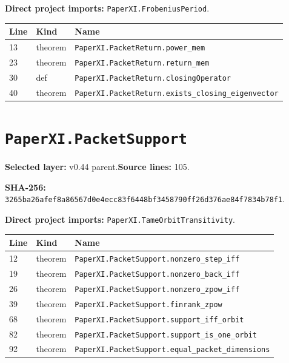 \documentclass[10pt,oneside]{book}
\begin{document}
\textbf{Direct project imports:} \nolinkurl{PaperXI.FrobeniusPeriod}.

\begin{longtable}{@{}p{}p{}p{}@{}}\toprule Line&Kind&Name\\\midrule\endhead

13&theorem&\nolinkurl{PaperXI.PacketReturn.power_mem}\\

23&theorem&\nolinkurl{PaperXI.PacketReturn.return_mem}\\

30&def&\nolinkurl{PaperXI.PacketReturn.closingOperator}\\

40&theorem&\nolinkurl{PaperXI.PacketReturn.exists_closing_eigenvector}\\

\bottomrule\end{longtable}

\section{\texorpdfstring{\nolinkurl{PaperXI.PacketSupport}}{PaperXI.PacketSupport}}\label{module:PaperXI.PacketSupport}

\textbf{Selected layer:} v0.44 parent.\quad\textbf{Source lines:} 105.\par\textbf{SHA-256:} {\scriptsize\nolinkurl{3265ba26afef8a86567d0e4ecc83f6448bf3458790ff26d376ae84f7834b78f1}}.


\textbf{Direct project imports:} \nolinkurl{PaperXI.TameOrbitTransitivity}.

\begin{longtable}{@{}p{}p{}p{}@{}}\toprule Line&Kind&Name\\\midrule\endhead

12&theorem&\nolinkurl{PaperXI.PacketSupport.nonzero_step_iff}\\

19&theorem&\nolinkurl{PaperXI.PacketSupport.nonzero_back_iff}\\

26&theorem&\nolinkurl{PaperXI.PacketSupport.nonzero_zpow_iff}\\

39&theorem&\nolinkurl{PaperXI.PacketSupport.finrank_zpow}\\

68&theorem&\nolinkurl{PaperXI.PacketSupport.support_iff_orbit}\\

82&theorem&\nolinkurl{PaperXI.PacketSupport.support_is_one_orbit}\\

92&theorem&\nolinkurl{PaperXI.PacketSupport.equal_packet_dimensions}\\

\bottomrule\end{longtable}
\end{document}
